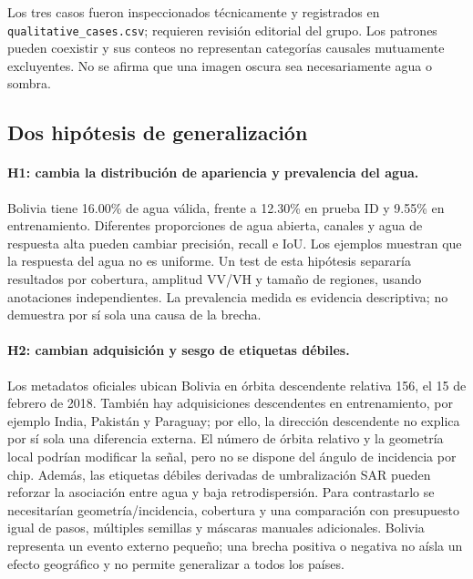 Los tres casos fueron inspeccionados técnicamente y registrados en
\texttt{qualitative\_cases.csv}; requieren revisión editorial del grupo.
Los patrones pueden coexistir y sus conteos no representan categorías causales mutuamente
excluyentes. No se afirma que una imagen oscura sea necesariamente agua o sombra.


\subsection{Dos hipótesis de generalización}
\paragraph{H1: cambia la distribución de apariencia y prevalencia del agua.}
Bolivia tiene 16.00\% de agua válida, frente a 12.30\% en prueba ID y 9.55\% en entrenamiento.
Diferentes proporciones de agua abierta, canales y agua de respuesta alta pueden cambiar
precisión, recall e IoU. Los ejemplos muestran que la respuesta del agua no es uniforme.
Un test de esta hipótesis separaría resultados por cobertura, amplitud VV/VH y tamaño de
regiones, usando anotaciones independientes. La prevalencia medida es evidencia descriptiva;
no demuestra por sí sola una causa de la brecha.

\paragraph{H2: cambian adquisición y sesgo de etiquetas débiles.}
Los metadatos oficiales ubican Bolivia en órbita descendente relativa 156, el 15 de febrero
de 2018. También hay adquisiciones descendentes en entrenamiento, por ejemplo India,
Pakistán y Paraguay; por ello, la dirección descendente no explica por sí sola una diferencia externa.
El número de órbita relativo y la geometría local podrían modificar la señal, pero no
se dispone del ángulo de incidencia por chip. Además, las etiquetas débiles derivadas
de umbralización SAR pueden reforzar la asociación entre agua y baja retrodispersión.
Para contrastarlo se necesitarían geometría/incidencia, cobertura y una comparación con
presupuesto igual de pasos, múltiples semillas y máscaras manuales adicionales.
Bolivia representa un evento externo pequeño; una brecha positiva o negativa no aísla
un efecto geográfico y no permite generalizar a todos los países.
